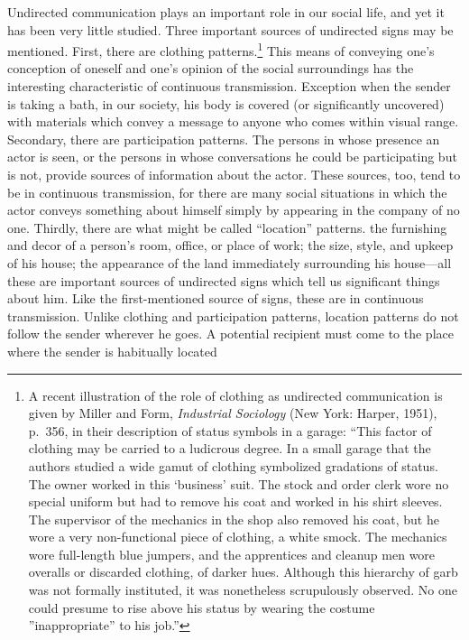 \documentclass[twoside,symmetric,nobib,justified]{tufte-book}
\begin{document}
Undirected communication plays an important role in our social life, and
yet it has been very little studied. Three important sources of
undirected signs may be mentioned. First, there are clothing
patterns.\footnote{A recent illustration of the role of clothing as
  undirected communication is given by Miller and Form, \emph{Industrial
  Sociology} (New York: Harper, 1951), p.~356, in their description of
  status symbols in a garage: ``This factor of clothing may be carried
  to a ludicrous degree. In a small garage that the authors studied a
  wide gamut of clothing symbolized gradations of status. The owner
  worked in this `business' suit. The stock and order clerk wore no
  special uniform but had to remove his coat and worked in his shirt
  sleeves. The supervisor of the mechanics in the shop also removed his
  coat, but he wore a very non-functional piece of clothing, a white
  smock. The mechanics wore full-length blue jumpers, and the
  apprentices and cleanup men wore overalls or discarded clothing, of
  darker hues. Although this hierarchy of garb was not formally
  instituted, it was nonetheless scrupulously observed. No one could
  presume to rise above his status by wearing the costume
  ''inappropriate'' to his job.''} This means of conveying one's
conception of oneself and one's opinion of the social surroundings has
the interesting characteristic of continuous transmission. Exception
when the sender is taking a bath, in our society, his body is covered
(or significantly uncovered) with materials which convey a message to
anyone who comes within visual range. Secondary, there are participation
patterns. The persons in whose presence an actor is seen, or the persons
in whose conversations he could be participating but is not, provide
sources of information about the actor. These sources, too, tend to be
in continuous transmission, for there are many social situations in
which the actor conveys something about himself simply by appearing in
the company of no one. Thirdly, there are what might be called
``location'' patterns. the furnishing and decor of a person's room,
office, or place of work; the size, style, and upkeep of his house; the
appearance of the land immediately surrounding his house---all these are
important sources of undirected signs which tell us significant things
about him. Like the first-mentioned source of signs, these are in
continuous transmission. Unlike clothing and participation patterns,
location patterns do not follow the sender wherever he goes. A potential
recipient must come to the place where the sender is habitually located
\end{document}
